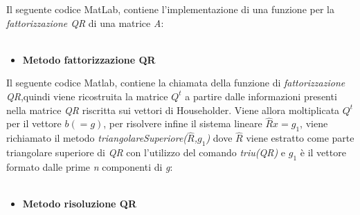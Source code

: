 Il seguente codice MatLab, contiene l'implementazione di una funzione per la \textit{fattorizzazione QR} di una matrice \textit{A}:\\\
\begin{itemize}
	\item \textbf{Metodo fattorizzazione QR}
		
\end{itemize}
Il seguente codice Matlab, contiene la chiamata della funzione di \textit{fattorizzazione QR},quindi viene ricostruita la matrice $Q^t$ a partire dalle informazioni presenti nella matrice \textit{QR} riscritta sui vettori di Householder. Viene allora moltiplicata $Q^t$ per il vettore $b(=g)$, per risolvere infine il sistema lineare $\hat{R}x=g_1$, viene richiamato il metodo \textit{triangolareSuperiore($\hat{R}$,$g_1$)} dove $\hat{R}$ viene estratto come parte triangolare superiore di \textit{QR} con l'utilizzo del comando \textit{triu(QR)} e $g_1$ è il vettore formato dalle prime \textit{n} componenti di \textit{g}: \\\
\begin{itemize}
	\item \textbf{Metodo risoluzione QR}
		
\end{itemize}